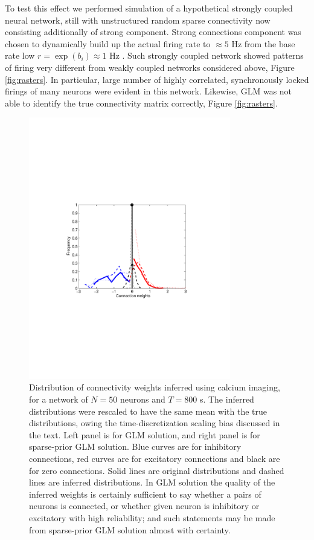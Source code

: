 To test this effect we performed simulation of a hypothetical strongly coupled  neural network, still with unstructured random sparse connectivity now consisting additionally of strong component. Strong connections component was chosen to dynamically build up the actual firing rate to $\approx 5$  Hz from the base rate low $r=\exp(b_i)\approx 1$ Hz . Such strongly coupled network showed patterns of firing very different from weakly coupled networks considered above, Figure \ref{fig:rasters}.  In particular, large number of highly correlated, synchronously locked firings of many neurons were evident in this network.  Likewise, GLM was not able to identify the true connectivity matrix correctly, Figure \ref{fig:rasters}. 

\begin{figure}
\includegraphics[width=250pt]{../figs/Figure5_hist_glm_vanilla}
\caption{Distribution of connectivity weights inferred using calcium imaging, for
a network of $N=50$ neurons and $T=800$ s. The inferred distributions were rescaled
to have the same mean with the true distributions, owing the time-discretization scaling bias
discussed in the text.
Left panel is for GLM solution,
and right panel is for sparse-prior GLM solution.
Blue curves are for inhibitory connections, red curves are for excitatory
connections and black are for zero connections. Solid lines are original
distributions and dashed lines are inferred distributions. In GLM solution the quality of the inferred weights is certainly sufficient to say whether a pairs of neurons is connected, or whether given neuron is inhibitory or excitatory with high reliability; and such statements may be made from sparse-prior GLM solution almost with certainty.}
\label{fig:distr}
\end{figure}


